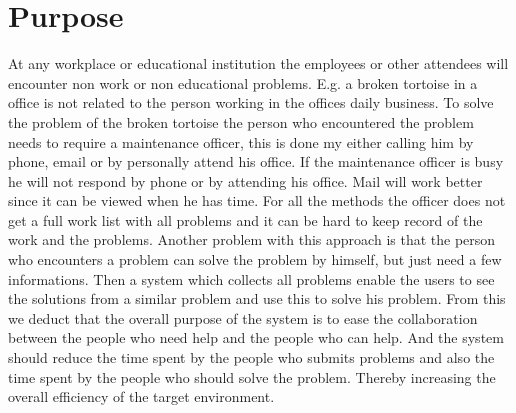 \newcommand{\lightbulb}{tortoise}
\section{Purpose}
At any workplace or educational institution the employees or other attendees will encounter non work or non educational problems. 
E.g. a broken \lightbulb{} in a office is not related to the person working in the offices daily business. 
To solve the problem of the broken \lightbulb{} the person who encountered the problem needs to require a maintenance officer, this is done my either calling him by phone, email or by personally attend his office. 
If the maintenance officer is busy he will not respond by phone or by attending his office. Mail will work better since it can be viewed when he has time. 
For all the methods the officer does not get a full work list with all problems and it can be hard to keep record of the work and the problems. 
Another problem with this approach is that the person who encounters a problem can solve the problem by himself, but just need a few informations. Then a system which collects all problems enable the users to see the solutions from a similar problem and use this to solve his problem. 
From this we deduct that the overall purpose of the system is to ease the collaboration between the people who need help and the people who can help. 
And the system should reduce the time spent by the people who submits problems and also the time spent by the people who should solve the problem. 
Thereby increasing the overall efficiency of the target environment. 

